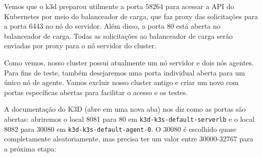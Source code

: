 \documentclass[
]{article}
\newenvironment{Shaded}{}{}
\newcommand{\AttributeTok}[1]{\textcolor[rgb]{0.49,0.56,0.16}{#1}}
\newcommand{\DecValTok}[1]{\textcolor[rgb]{0.25,0.63,0.44}{#1}}
\newcommand{\ExtensionTok}[1]{#1}
\newcommand{\NormalTok}[1]{#1}
\newcommand{\OperatorTok}[1]{\textcolor[rgb]{0.40,0.40,0.40}{#1}}
\newcommand{\StringTok}[1]{\textcolor[rgb]{0.25,0.44,0.63}{#1}}
\newcommand{\VariableTok}[1]{\textcolor[rgb]{0.10,0.09,0.49}{#1}}
\begin{document}
Vemos que o k3d preparou utilmente a porta 58264 para acessar a API do
Kubernetes por meio do balanceador de carga, que faz proxy das
solicitações para a porta 6443 no nó do servidor. Além disso, a porta 80
está aberta no balanceador de carga. Todas as solicitações ao
balanceador de carga serão enviadas por proxy para o nó servidor do
cluster.

Como vemos, nosso cluster possui atualmente um nó servidor e dois nós
agentes. Para fins de teste, também desejaremos uma porta individual
aberta para um único nó de agente. Vamos excluir nosso cluster antigo e
criar um novo com portas específicas abertas para facilitar o acesso e
os testes.

A documentação do K3D (abre em uma nova aba) nos diz como as portas são
abertas: abriremos o local 8081 para 80 em
\texttt{k3d-k3s-default-serverlb} e o local 8082 para 30080 em
\texttt{k3d-k3s-default-agent-0}. O 30080 é escolhido quase
completamente aleatoriamente, mas precisa ter um valor entre 30000-32767
para a próxima etapa:

\begin{Shaded}
\end{Shaded}
\end{document}
